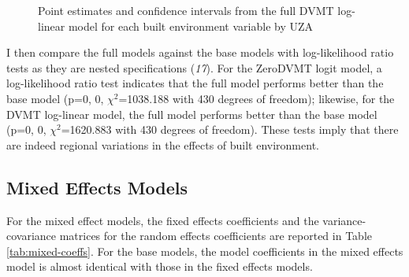 \documentclass[numbered]{trbunofficial}
\begin{document}
\begin{figure}

{\centering {}\newline{}\newline{}

}

\caption{Point estimates and confidence intervals from the full DVMT log-linear model for each built environment variable by UZA}\label{fig:fixed-coeffs-viz2}
\end{figure}

I then compare the full models against the base models with log-likelihood ratio tests as they are nested specifications (\emph{17}). For the ZeroDVMT logit model, a log-likelihood ratio test indicates that the full model performs better than the base model (p=0, 0, \(\chi^2\)=1038.188 with 430 degrees of freedom); likewise, for the DVMT log-linear model, the full model performs better than the base model (p=0, 0, \(\chi^2\)=1620.883 with 430 degrees of freedom). These tests imply that there are indeed regional variations in the effects of built environment.

\hypertarget{mixed-effects-models}{%
\subsection{Mixed Effects Models}\label{mixed-effects-models}}

For the mixed effect models, the fixed effects coefficients and the variance-covariance matrices for the random effects coefficients are reported in Table \ref{tab:mixed-coeffs}. For the base models, the model coefficients in the mixed effects model is almost identical with those in the fixed effects models.
\end{document}
